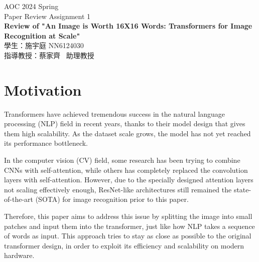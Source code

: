 \documentclass[12pt]{article}
\begin{document}


\begin{titlepage}
\begin{center}

\vspace*{1cm}
\large AOC 2024 Spring \\
\Large Paper Review Assignment 1 \\

\vspace{2cm}
\LARGE \textbf{Review of "An Image is Worth 16X16 Words: Transformers for Image Recognition at Scale"} \\

\vfill
\normalsize
學生：施宇庭 NN6124030 \\ [0.2cm]
指導教授：蔡家齊 \ 助理教授 \\ [0.2cm]

\end{center}
\end{titlepage}



\section{Motivation}

Transformers have achieved tremendous success in the natural language processing (NLP) field in recent years, thanks to their model design that gives them high scalability. As the dataset scale grows, the model has not yet reached its performance bottleneck.

In the computer vision (CV) field, some research has been trying to combine CNNs with self-attention, while others has completely replaced the convolution layers with self-attention. However, due to the specially designed attention layers not scaling effectively enough, ResNet-like architectures still remained the state-of-the-art (SOTA) for image recognition prior to this paper.

Therefore, this paper aims to address this issue by splitting the image into small patches and input them into the transformer, just like how NLP takes a sequence of words as input. This approach tries to stay as close as possible to the original transformer design, in order to exploit its efficiency and scalability on modern hardware.
\end{document}
